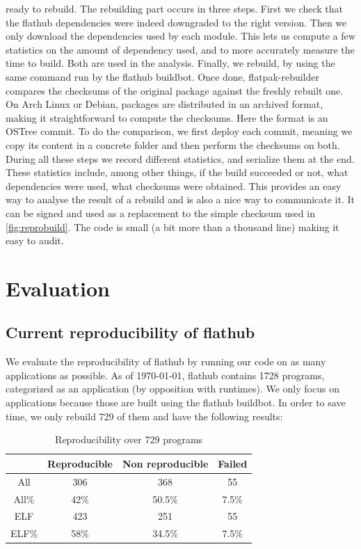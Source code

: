 \documentclass[a4paper,11pt,oneside]{report}
\theoremstyle{definition}
\newcommand{\sysname}{flatpak-rebuilder\xspace}
\newcommand{\fh}{flathub\xspace}
\newcommand{\fhbb}{flathub buildbot\xspace}
\newcommand{\ot}{OSTree\xspace}
\begin{document}
ready to rebuild. The rebuilding part occurs in three steps. First we check
that the \fh dependencies were indeed downgraded to the right version. Then we
only download the dependencies used by each module. This lets us compute a few
statistics on the amount of dependency used, and to more accurately measure the
time to build. Both are used in the analysis. Finally, we rebuild, by using the
same command run by the \fhbb. Once done, \sysname compares the checksums of
the original package against the freshly rebuilt one. On Arch Linux or Debian,
packages are distributed in an archived format, making it straightforward to
compute the checksums. Here the format is an \ot commit. To do the
comparison, we first deploy each commit, meaning we copy its content in a
concrete folder and then perform the checksums on both. During all these steps
we record different statistics, and serialize them at the end. These statistics
include, among other things, if the build succeeded or not, what dependencies
were used, what checksums were obtained. This provides an easy way to analyse
the result of a rebuild and is also a nice way to communicate it. It can be
signed and used as a replacement to the simple checksum used in
\autoref{fig:reprobuild}. The code is small (a bit more than a thousand line)
making it easy to audit.

\chapter{Evaluation}
\label{chap:eval}

\section{Current reproducibility of \fh}
\label{sec:cr}
We evaluate the reproducibility of \fh by running our code on as many
applications as possible. As of \today, \fh contains 1728 programs, categorized
as an application (by opposition with runtimes). We only focus on applications
because those are built using the \fhbb. In order to save time, we only rebuild
729 of them and have the following results:

\begin{table}[h]
    \centering
        \begin{tabular}{|c|c|c|c|}
            \hline
            & Reproducible & Non reproducible & Failed\\
            \hline
            All & 306 & 368 & 55\\
            \hline
            All\% & 42\% & 50.5\% & 7.5\% \\
            \hline
            ELF & 423 & 251 & 55\\
            \hline
            ELF\% & 58\% & 34.5\% & 7.5\% \\
            \hline
        \end{tabular}
    \caption{Reproducibility over 729 programs}
    \label{tab:rebuild-all}
\end{table}
\end{document}
